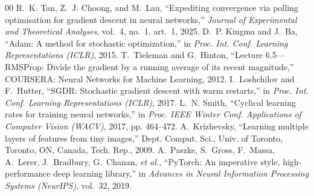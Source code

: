 \documentclass[conference]{IEEEtran}
\begin{document}
\begin{thebibliography}{00}
 R.~K. Tan, Z.~J. Choong, and M.~Lau, ``Expediting convergence via polling optimisation for gradient descent in neural networks,'' \emph{Journal of Experimental and Theoretical Analyses}, vol.~4, no.~1, art.~1, 2025.
 D.~P. Kingma and J.~Ba, ``Adam: A method for stochastic optimization,'' in \emph{Proc. Int. Conf. Learning Representations (ICLR)}, 2015.
 T.~Tieleman and G.~Hinton, ``Lecture 6.5---RMSProp: Divide the gradient by a running average of its recent magnitude,'' COURSERA: Neural Networks for Machine Learning, 2012.
 I.~Loshchilov and F.~Hutter, ``SGDR: Stochastic gradient descent with warm restarts,'' in \emph{Proc. Int. Conf. Learning Representations (ICLR)}, 2017.
 L.~N. Smith, ``Cyclical learning rates for training neural networks,'' in \emph{Proc. IEEE Winter Conf. Applications of Computer Vision (WACV)}, 2017, pp. 464--472.
 A.~Krizhevsky, ``Learning multiple layers of features from tiny images,'' Dept. Comput. Sci., Univ. of Toronto, Toronto, ON, Canada, Tech. Rep., 2009.
 A.~Paszke, S.~Gross, F.~Massa, A.~Lerer, J.~Bradbury, G.~Chanan, \emph{et al.}, ``PyTorch: An imperative style, high-performance deep learning library,'' in \emph{Advances in Neural Information Processing Systems (NeurIPS)}, vol.~32, 2019.
\end{thebibliography}
\end{document}
